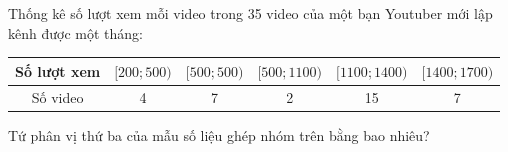 \begin{bt}%
	Thống kê số lượt xem mỗi video trong 35 video của một bạn Youtuber mới lập kênh được một tháng:
\begin{center}
		\begin{tabular}{|c|c|c|c|c|c|}
		\hline
		Số lượt xem & {$[200;500)$} & {$[500;500)$} & $[500;1100)$ & $[1100;1400)$ & $[1400;1700)$ \\
		\hline
		Số video & 4 & 7 & 2 & 15 & 7 \\
		\hline
	\end{tabular}
\end{center}
	Tứ phân vị thứ ba của mẫu số liệu ghép nhóm trên bằng bao nhiêu?
\loigiai{
	Ta có $ Q_{3}=x_{27} \in [1100; 1400)$.\\
	Suy ra $Q_{3}=1100+\dfrac{\dfrac{3\cdot 35}{4}-13}{15}\cdot 300= 1365$.	
	}
	\end{bt}

